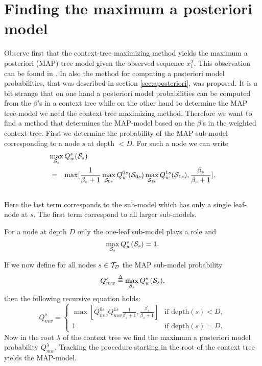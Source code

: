 \documentclass[10pt,conference]{IEEEtran}
\newcommand{\xT}{x^{T}_{1}}
\newcommand{\cS}{{\cal{S}}}
\newcommand{\cTD}{{\cal{T}_{D}}}
\newcommand{\define}{\stackrel{\Delta}{=}}
\begin{document}
\section{Finding the maximum a posteriori model}

Observe first that the context-tree maximizing method yields the maximum a posteriori (MAP) tree model given the observed sequence $\xT$.
This observation can be found in \cite{WilNowVol02}.
In \cite{WilNowVol02} also the method for computing a posteriori model probabilities, that was described in section \ref{sec:aposteriori}, was proposed.
It is a bit strange that on one hand a posteriori model probabilities can be computed from the $\beta$'s in a context tree while on the other hand to determine the MAP tree-model we need the context-tree maximizing method.
Therefore we want to find a method that determines the MAP-model based on the $\beta$'s in the weighted context-tree.
First we determine the probability of the MAP sub-model corresponding to a node $s$ at depth $<D$.
For such a node we can write
\begin{eqnarray}
\lefteqn{\max_{\cS_s} Q_{w}^{s}(\cS_{s})} \nonumber \\
&=& \max [ \frac{1}{\beta_{s}+1} \max_{\cS_{0s}} Q_{w}^{0s}(\cS_{0s}) \max_{\cS_{1s}} Q_{w}^{1s}(\cS_{1s}) , \frac{\beta_s}{\beta_{s}+1} ].  \nonumber \\
&&
\end{eqnarray}
Here the last term corresponds to the sub-model which has only a single leaf-node at $s$.
The first term correspond to all larger sub-models.

For a node at depth $D$ only the one-leaf sub-model plays a role and
\begin{equation}
\max_{\cS_s} Q_{w}^{s}(\cS_{s}) = 1.
\end{equation}

If we now define for all nodes $s\in\cTD$ the MAP sub-model probability
\begin{equation}
Q_{mw}^{s} \define  \max_{\cS_s} Q_{w}^{s}(\cS_{s}),
\end{equation}
then the following recursive equation holds:
\begin{equation}
\label{def:MAP}
Q_{mw}^{s} =
\left\{\begin{array}{ll}
                \max [ Q_{mw}^{0s} Q_{mw}^{1s} \frac{1}{\beta_{s}+1} , \frac{\beta_{s}}{\beta_{s}+1} ] &\mbox{if depth$(s)<D,$} \\
                1 &\mbox{if depth$(s)=D.$}
                       \end{array} \right.
\end{equation}
Now in the root $\lambda$ of the context tree we find the maximum a posteriori model probability $Q_{mw}^{\lambda}$.
Tracking the procedure starting in the root of the context tree yields the MAP-model.
\end{document}
